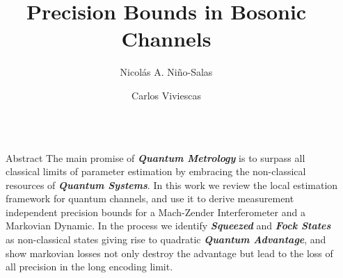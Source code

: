 \documentclass[final]{beamer}
\title{ Precision Bounds in Bosonic Channels}
\author{Nicolás A. Niño-Salas  \and Carlos Viviescas }
\institute[shortinst]{Universidad Nacional de Colombia, Sede Bogotá }
\newlength{\sepwidth}
\newlength{\colwidth}
\newcommand{\separatorcolumn}{\begin{column}{\sepwidth}\end{column}}
\begin{document}
\begin{frame}[t]
\begin{columns}[t]
\separatorcolumn

\begin{column}{\colwidth}

  \begin{block}{Abstract}
    The main promise of \textit{\textbf{Quantum Metrology}} is to surpass all classical limits of \mbox{parameter} estimation
    by embracing the non-classical resources of \textbf{\textit{Quantum
        Systems}}.
    In this work we review the local estimation framework for quantum
    channels, and use it to derive measurement
    independent precision bounds for a Mach-Zender \mbox{Interferometer} and a Markovian Dynamic.
    In the process we identify \textit{\textbf{Squeezed}} and \textit{\textbf{Fock States}} as  non-classical
    states giving rise to quadratic \textit{\textbf{Quantum Advantage}}, and show markovian losses not only
    destroy  the advantage but lead to the loss of all precision in the long encoding limit.

  \end{block}


\end{column}
\end{columns}
\end{frame}
\end{document}
